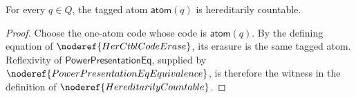 \begin{lemma}
For every $q\in Q$, the tagged atom $\mathsf{atom}(q)$ is hereditarily
countable.
\end{lemma}
\begin{proof}
Choose the one-atom code whose code is $\mathsf{atom}(q)$.  By the defining
equation of $\noderef{HerCtblCodeErase}$, its erasure is the same tagged
atom.  Reflexivity of $\mathsf{PowerPresentationEq}$, supplied by
$\noderef{PowerPresentationEqEquivalence}$, is therefore the witness in
the definition of $\noderef{HereditarilyCountable}$.
\end{proof}
